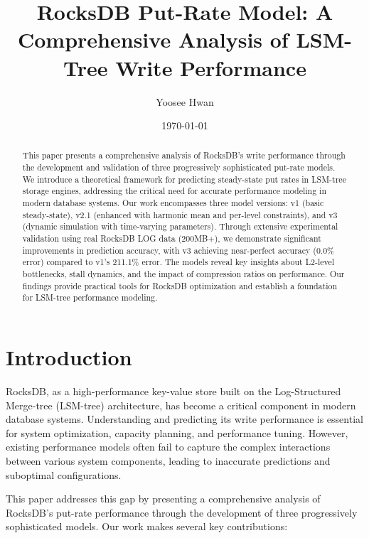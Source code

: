 \documentclass[11pt,twocolumn]{article}
\title{RocksDB Put-Rate Model: A Comprehensive Analysis of LSM-Tree Write Performance}
\author{Yoosee Hwan}
\date{\today}
\begin{document}
\maketitle

\begin{abstract}
This paper presents a comprehensive analysis of RocksDB's write performance through the development and validation of three progressively sophisticated put-rate models. We introduce a theoretical framework for predicting steady-state put rates in LSM-tree storage engines, addressing the critical need for accurate performance modeling in modern database systems. Our work encompasses three model versions: v1 (basic steady-state), v2.1 (enhanced with harmonic mean and per-level constraints), and v3 (dynamic simulation with time-varying parameters). Through extensive experimental validation using real RocksDB LOG data (200MB+), we demonstrate significant improvements in prediction accuracy, with v3 achieving near-perfect accuracy (0.0\% error) compared to v1's 211.1\% error. The models reveal key insights about L2-level bottlenecks, stall dynamics, and the impact of compression ratios on performance. Our findings provide practical tools for RocksDB optimization and establish a foundation for LSM-tree performance modeling.
\end{abstract}

\section{Introduction}

RocksDB, as a high-performance key-value store built on the Log-Structured Merge-tree (LSM-tree) architecture, has become a critical component in modern database systems. Understanding and predicting its write performance is essential for system optimization, capacity planning, and performance tuning. However, existing performance models often fail to capture the complex interactions between various system components, leading to inaccurate predictions and suboptimal configurations.

This paper addresses this gap by presenting a comprehensive analysis of RocksDB's put-rate performance through the development of three progressively sophisticated models. Our work makes several key contributions:
\end{document}
